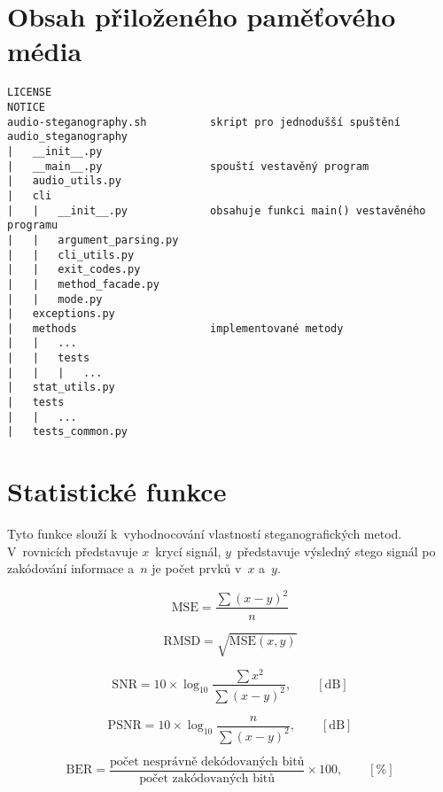 \chapter{Obsah přiloženého paměťového média}
\label{cha:medium-contents}

\begin{verbatim}
LICENSE
NOTICE
audio-steganography.sh          skript pro jednodušší spuštění
audio_steganography
|   __init__.py
|   __main__.py                 spouští vestavěný program
|   audio_utils.py
|   cli
|   |   __init__.py             obsahuje funkci main() vestavěného programu
|   |   argument_parsing.py
|   |   cli_utils.py
|   |   exit_codes.py
|   |   method_facade.py
|   |   mode.py
|   exceptions.py
|   methods                     implementované metody
|   |   ...
|   |   tests
|   |   |   ...
|   stat_utils.py
|   tests
|   |   ...
|   tests_common.py
\end{verbatim}

\chapter{Statistické funkce}
\label{cha:statistical-functions}

Tyto funkce slouží k~vyhodnocování vlastností steganografických metod.
V~rovnicích představuje $x$~krycí signál, $y$~představuje výsledný stego
signál po zakódování informace a~$n$ je počet prvků v~$x$ a~$y$.

\begin{equation}
    \textrm{MSE} = \frac{\sum{(x-y)^2}}{n}
\end{equation}

\begin{equation}
    \textrm{RMSD} = \sqrt{\textrm{MSE}(x, y)}
\end{equation}

\begin{equation}
    \textrm{SNR} = 10 \times \log_{10}{\frac{\sum{x^2}}{\sum{(x-y)^2}}}, \qquad [\textrm{dB}]
\end{equation}

\begin{equation}
    \textrm{PSNR} = 10 \times \log_{10}{\frac{n}{\sum{(x-y)^2}}}, \qquad [\textrm{dB}]
\end{equation}

\begin{equation}
    \textrm{BER} = \frac{\textrm{počet nesprávně dekódovaných bitů}}{\textrm{počet zakódovaných bitů}} \times 100, \qquad [\%]
\end{equation}
